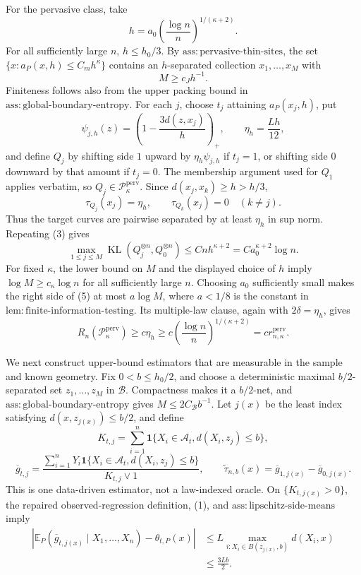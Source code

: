 For the pervasive class, take
\[
 h=a_0\left(\frac{\log n}{n}\right)^{1/(\kappa+2)}.
\]
For all sufficiently large \(n\), \(h\le h_0/3\).  By \(\mathrm{ass:pervasive\text{-}thin\text{-}sites}\), the set \(\{x:a_P(x,h)\le C_mh^\kappa\}\) contains an \(h\)-separated collection \(x_1,\ldots,x_M\) with
\[
 M\ge c_Jh^{-1}.
\]
Finiteness follows also from the upper packing bound in \(\mathrm{ass:global\text{-}boundary\text{-}entropy}\).  For each \(j\), choose \(t_j\) attaining \(a_P(x_j,h)\), put
\[
 \psi_{j,h}(z)=\left(1-\frac{3d(z,x_j)}h\right)_+,
 \qquad \eta_h=\frac{Lh}{12},
\]
and define \(Q_j\) by shifting side \(1\) upward by \(\eta_h\psi_{j,h}\) if \(t_j=1\), or shifting side \(0\) downward by that amount if \(t_j=0\).  The membership argument used for \(Q_1\) applies verbatim, so \(Q_j\in\mathcal P_\kappa^{\mathrm{perv}}\).  Since \(d(x_j,x_k)\ge h>h/3\),
\[
 \tau_{Q_j}(x_j)=\eta_h,
 \qquad \tau_{Q_k}(x_j)=0\quad(k\ne j).
\]
Thus the target curves are pairwise separated by at least \(\eta_h\) in sup norm.  Repeating (3) gives
\[
 \max_{1\le j\le M}\operatorname{KL}(Q_j^{\otimes n},Q_0^{\otimes n})
 \le Cn h^{\kappa+2}
 =C a_0^{\kappa+2}\log n. \tag{5}
\]
For fixed \(\kappa\), the lower bound on \(M\) and the displayed choice of \(h\) imply \(\log M\ge c_\kappa\log n\) for all sufficiently large \(n\).  Choosing \(a_0\) sufficiently small makes the right side of (5) at most \(a\log M\), where \(a<1/8\) is the constant in \(\mathrm{lem:finite\text{-}information\text{-}testing}\).  Its multiple-law clause, again with \(2\delta=\eta_h\), gives
\[
 R_n(\mathcal P_\kappa^{\mathrm{perv}})
 \ge c\eta_h
 \ge c\left(\frac{\log n}{n}\right)^{1/(\kappa+2)}
 =c r_{n,\kappa}^{\mathrm{perv}}. \tag{6}
\]

We next construct upper-bound estimators that are measurable in the sample and known geometry.  Fix \(0<b\le h_0/2\), and choose a deterministic maximal \(b/2\)-separated set \(z_1,\ldots,z_M\) in \(\mathcal B\).  Compactness makes it a \(b/2\)-net, and \(\mathrm{ass:global\text{-}boundary\text{-}entropy}\) gives \(M\le2C_{\mathcal B}b^{-1}\).  Let \(j(x)\) be the least index satisfying \(d(x,z_{j(x)})\le b/2\), and define
\[
 K_{t,j}=\sum_{i=1}^n\mathbf1\{X_i\in\mathcal A_t,d(X_i,z_j)\le b\},
\]
\[
 \overline g_{t,j}
 =\frac{\sum_{i=1}^nY_i\mathbf1\{X_i\in\mathcal A_t,d(X_i,z_j)\le b\}}
 {K_{t,j}\vee1},
 \qquad
 \widetilde\tau_{n,b}(x)=\overline g_{1,j(x)}-\overline g_{0,j(x)}.
\]
This is one data-driven estimator, not a law-indexed oracle.  On \(\{K_{t,j(x)}>0\}\), the repaired observed-regression definition, (1), and \(\mathrm{ass:lipschitz\text{-}side\text{-}means}\) imply
\[
 \begin{aligned}
 \left|\mathbb E_P(\overline g_{t,j(x)}\mid X_1,\ldots,X_n)-\theta_{t,P}(x)\right|
 &\le L\max_{i:X_i\in B(z_{j(x)},b)}d(X_i,x)\\
 &\le \frac{3Lb}{2}. \tag{7}
 \end{aligned}
\]

